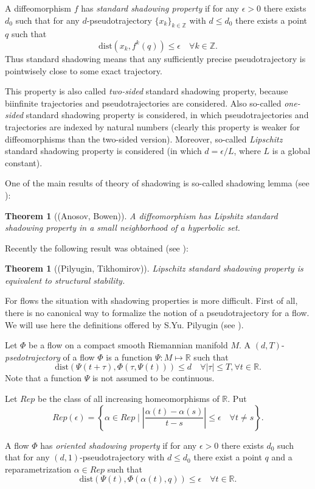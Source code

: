 \documentclass[11pt]{article}
\newcounter{razdel}[section]
\theoremstyle{Mystyle}
\newtheorem{Theorem}[razdel]{Theorem}
\begin{document}
A diffeomorphism $f$ has \textit{standard shadowing property} if for any $\epsilon>0$ there exists $d_0$ such that for any $d$-pseudotrajectory $\{x_k\}_{k\in\mathbb{Z}}$ with $d\leq d_0$ there exists a point $q$ such that
$$\mbox{dist}(x_k,f^k(q))\leq\epsilon\quad\forall k\in\mathbb{Z}.$$
Thus standard shadowing means that any sufficiently precise pseudotrajectory is pointwisely close to some exact trajectory.

This property is also called \textit{two-sided} standard shadowing property, because biinfinite trajectories and pseudotrajectories are considered. Also so-called \textit{one-sided} standard shadowing property is considered, in which pseudotrajectories and trajectories are indexed by natural numbers (clearly this property is weaker for diffeomorphisms than the two-sided version).  Moreover, so-called \textit{Lipschitz} standard shadowing property is considered (in which $d=\epsilon/L$, where $L$ is a global constant).

One of the main results of theory of shadowing is so-called shadowing lemma (see \cite{An,Bow}):
\begin{Theorem}[(Anosov, Bowen)]
A diffeomorphism has Lipshitz standard shadowing property in a small neighborhood of a hyperbolic set.
\end{Theorem}
Recently the following result was obtained (see \cite{PT}):
\begin{Theorem}[(Pilyugin, Tikhomirov)]
Lipschitz standard shadowing property is equivalent to structural stability.
\end{Theorem}

For flows the situation with shadowing properties is more difficult. First of all, there is no canonical way to formalize the notion of a pseudotrajectory for a flow. We will use here the definitions offered by S.Yu. Pilyugin (see \cite{Pil}).

Let $\Phi$ be a flow on a compact smooth Riemannian manifold $M$. A $(d,T)$-\textit{psedotrajectory} of a flow $\Phi$ is a function $\Psi:M\mapsto\mathbb{R}$ such that
$$\mbox{dist}(\Psi(t+\tau),\Phi(\tau,\Psi(t)))\leq d\quad\forall |\tau|\leq T,\forall t\in\mathbb{R}.$$
Note that a function $\Psi$ is not assumed to be continuous.

Let $Rep$ be the class of all increasing homeomorphisms of $\mathbb{R}$. Put
$$Rep(\epsilon)=\left\{\alpha\in Rep\mid \left|\frac{\alpha(t) - \alpha(s)}{t-s}\right|\leq\epsilon\quad\forall t\neq s\right\}.$$

A flow $\Phi$ has \textit{oriented shadowing property} if for any $\epsilon>0$ there exists $d_0$ such that for any $(d,1)$-pseudotrajectory with $d\leq d_0$ there exist a point $q$ and a reparametrization $\alpha\in Rep$ such that
$$\mbox{dist}(\Psi(t),\Phi(\alpha(t), q))\leq\epsilon\quad\forall t\in\mathbb{R}.$$
\end{document}
